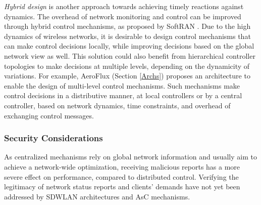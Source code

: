 \textit{Hybrid design} is another approach towards achieving timely reactions against dynamics.
The overhead of network monitoring and control can be improved through hybrid control mechanisms, as proposed by SoftRAN \cite{gudipati2013softran}.
Due to the high dynamics of wireless networks, it is desirable to design control mechanisms that can make control decisions locally, while improving decisions based on the global network view as well.
This solution could also benefit from hierarchical controller topologies to make decisions at multiple levels, depending on the dynamicity of variations.
For example, AeroFlux (Section \ref{Archs}) proposes an architecture to enable the design of multi-level control mechanisms.
Such mechanisms make control decisions in a distributive manner, at local controllers or by a central controller, based on network dynamics, time constraints, and overhead of exchanging control messages.






\subsubsection{\textbf{Security Considerations}}
As centralized mechanisms rely on global network information and usually aim to achieve a network-wide optimization, receiving malicious reports has a more severe effect on performance, compared to distributed control.
Verifying the legitimacy of network status reports and clients' demands have not yet been addressed by SDWLAN architectures and AsC mechanisms.
%

